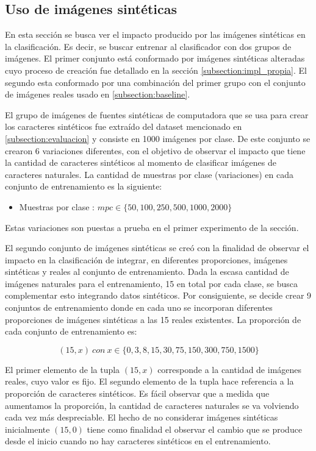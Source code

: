 \subsection{Uso de imágenes sintéticas}

	En esta sección se busca ver el impacto producido por las imágenes sintéticas en la clasificación. Es decir, se buscar entrenar al clasificador con dos grupos de imágenes. El primer conjunto está conformado por imágenes sintéticas alteradas cuyo proceso de creación fue detallado en la sección \ref{subsection:impl_propia}. El segundo esta conformado por una combinación del primer grupo con el conjunto de imágenes reales usado en \ref{subsection:baseline}.
	
	El grupo de imágenes de fuentes sintéticas de computadora que se usa para crear los caracteres sintéticos fue extraído del dataset mencionado en \ref{subsection:evaluacion} y consiste en 1000 imágenes por clase. De este conjunto se crearon 6 variaciones diferentes, con el objetivo de observar el impacto que tiene la cantidad de caracteres sintéticos al momento de clasificar imágenes de ca\-rac\-te\-res naturales. La cantidad de muestras por clase (variaciones) en cada conjunto de entrenamiento es la siguiente:
	\begin{itemize}
		\item Muestras por clase : $ mpc \in \{ 50,100,250,500,1000,2000\}$
	\end{itemize}
	
	Estas variaciones son puestas a prueba en el primer experimento de la sección.
	
	El segundo conjunto de imágenes sintéticas se creó con la finalidad de observar el impacto en la clasificación de integrar, en diferentes proporciones, imágenes sintéticas y reales al conjunto de entrenamiento. Dada la escasa cantidad de imágenes naturales para el entrenamiento, 15 en total por cada clase, se busca complementar esto integrando datos sintéticos. Por consiguiente, se decide crear 9 conjuntos de entrenamiento donde en cada uno se incorporan diferentes proporciones de imágenes sintéticas a las 15 reales existentes. La proporción de cada conjunto de entrenamiento es: 
	
	$$(15, x)~\textit{con}~ x \in \{0,3,8,15,30,75,150,300,750,1500 \}$$
	
	El primer elemento de la tupla $(15, x)$ corresponde a la cantidad de imágenes reales, cuyo valor es fijo. El segundo elemento de la tupla hace referencia a la proporción de caracteres sintéticos. Es fácil observar que a medida que aumentamos la proporción, la cantidad de caracteres naturales se va volviendo cada vez más despreciable. El hecho de no considerar imágenes sintéticas inicialmente $(15,0)$ tiene como finalidad el observar el cambio que se produce desde el inicio cuando no hay caracteres sintéticos en el entrenamiento.
	
